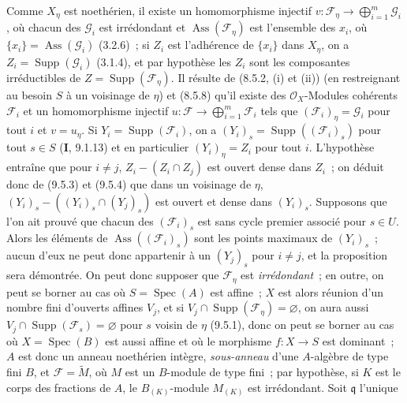 Comme $X_\eta$ est noethérien, il existe un homomorphisme injectif
$v:\mathcal F_\eta\to\bigoplus_{i=1}^m\mathcal G_i$, où chacun des $\mathcal G_i$ est
irrédondant et $\operatorname{Ass}(\mathcal F_\eta)$ est l'ensemble des $x_i$, où
$\{x_i\}=\operatorname{Ass}(\mathcal G_i)$ (3.2.6)~; si $Z_i$ est l'adhérence de
$\{x_i\}$ dans $X_\eta$, on a $Z_i=\operatorname{Supp}(\mathcal G_i)$ (3.1.4), et
par hypothèse les $Z_i$ sont les composantes irréductibles de
$Z=\operatorname{Supp}(\mathcal F_\eta)$. Il résulte de (8.5.2, (i) et (ii)) (en
restreignant au besoin $S$ à un voisinage de $\eta$) et (8.5.8) qu'il existe des
$\mathcal O_X$-Modules cohérents $\mathcal F_i$ et un homomorphisme injectif
$u:\mathcal F\to\bigoplus_{i=1}^m\mathcal F_i$ tels que $(\mathcal F_i)_\eta=\mathcal G_i$ pour
tout $i$ et $v=u_\eta$. Si $Y_i=\operatorname{Supp}(\mathcal F_i)$, on a
$(Y_i)_s=\operatorname{Supp}((\mathcal F_i)_s)$ pour tout $s\in S$
(\textbf{I}, 9.1.13) et en particulier $(Y_i)_\eta=Z_i$ pour tout $i$.
L'hypothèse entraîne que pour $i\neq j$, $Z_i-(Z_i\cap Z_j)$ est ouvert dense
dans $Z_i$~; on déduit donc de (9.5.3) et (9.5.4) que dans un voisinage de
$\eta$, $(Y_i)_s-((Y_i)_s\cap(Y_j)_s)$ est ouvert et dense dans $(Y_i)_s$.
Supposons que l'on ait prouvé que chacun des $(\mathcal F_i)_s$ est sans cycle
premier associé pour $s\in U$. Alors les éléments de
$\operatorname{Ass}((\mathcal F_i)_s)$ sont les points maximaux de $(Y_i)_s$~;
aucun d'eux ne peut donc appartenir à un $(Y_j)_s$ pour $i\neq j$, et la
proposition sera démontrée. On peut donc supposer que $\mathcal F_\eta$ est
\emph{irrédondant}~; en outre, on peut se borner au cas où
$S=\operatorname{Spec}(A)$ est affine~; $X$ est alors réunion d'un nombre fini
d'ouverts affines $V_j$, et si $V_j\cap\operatorname{Supp}(\mathcal F_\eta)
=\varnothing$, on aura aussi $V_j\cap\operatorname{Supp}(\mathcal F_s)=\varnothing$
pour $s$ voisin de $\eta$ (9.5.1), donc on peut se borner au cas où
$X=\operatorname{Spec}(B)$ est aussi affine et où le morphisme $f:X\to S$ est
dominant~; $A$ est donc un anneau noethérien intègre, \emph{sous-anneau} d'une
$A$-algèbre de type fini $B$, et $\mathcal F=\widetilde M$, où $M$ est un
$B$-module de type fini~; par hypothèse, si $K$ est le corps des fractions de
$A$, le $B_{(K)}$-module $M_{(K)}$ est irrédondant. Soit $\mathfrak q$ l'unique


